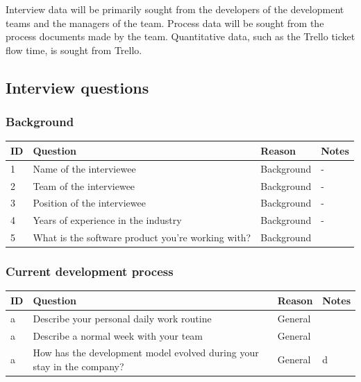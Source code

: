 \documentclass[english]{tktltiki2}
\theoremstyle{definition}
\theoremstyle{remark}
\begin{document}
Interview data will be primarily sought from the developers of the development teams and the managers of the team. Process data will be sought from the process documents made by the team. Quantitative data, such as the Trello ticket flow time, is sought from Trello. 

\subsection{Interview questions}

\subsubsection{Background}

\begin{center}
    \begin{tabular}{ | l | l | l | p{5cm} |}
    \hline
    ID & Question & Reason & Notes \\ \hline
    1 & Name of the interviewee & Background & - \\ \hline
    2 & Team of the interviewee & Background & - \\ \hline
    3 & Position of the interviewee & Background & - \\ \hline
    4 & Years of experience in the industry & Background & - \\ \hline
    5 & What is the software product you're working with? & Background &  \\ \hline
    \hline
    \end{tabular}
\end{center}

\subsubsection{Current development process}

\begin{center}
    \begin{tabular}{ | l | l | l | p{5cm} |}
    \hline
    ID & Question & Reason & Notes \\ \hline
    a & Describe your personal daily work routine & General & \\ \hline
    a & Describe a normal week with your team & General & \\ \hline
    a & How has the development model evolved during your stay in the company? & General & d \\ \hline
    \hline
    \end{tabular}
\end{center}
\end{document}
